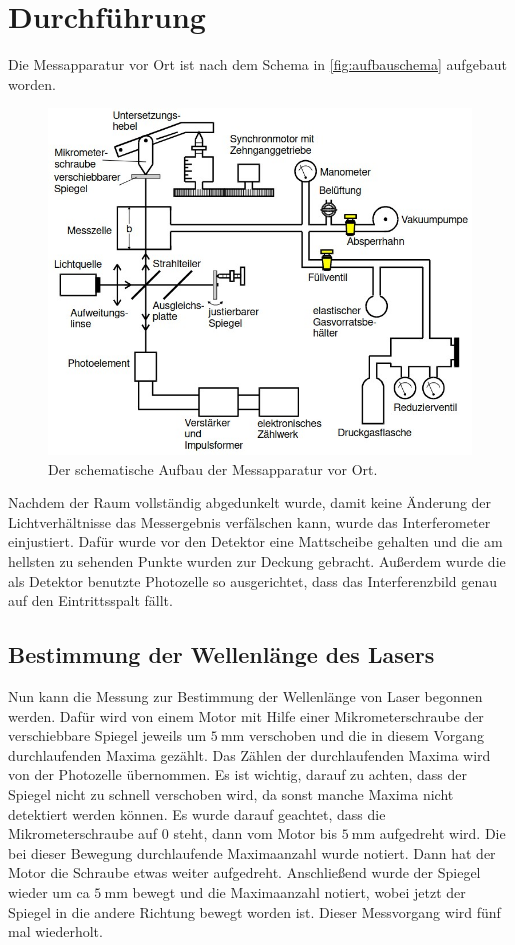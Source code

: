 \section{Durchführung}
\label{sec:Durchführung}
Die Messapparatur vor Ort ist nach dem Schema in \autoref{fig:aufbauschema} aufgebaut worden.
\begin{figure}
    \centering
    \includegraphics[width=\textwidth]{content/aufbauversuch.jpg}
    \caption{Der schematische Aufbau der Messapparatur vor Ort.}
    \label{fig:aufbauschema}
\end{figure}

\noindent
Nachdem der Raum vollständig abgedunkelt wurde, damit keine Änderung der Lichtverhältnisse das Messergebnis verfälschen kann, wurde das Interferometer einjustiert.
Dafür wurde vor den Detektor eine Mattscheibe gehalten und die am hellsten zu sehenden Punkte wurden zur Deckung gebracht. Außerdem wurde die als Detektor benutzte
Photozelle so ausgerichtet, dass das Interferenzbild genau auf den Eintrittsspalt fällt.


\subsection{Bestimmung der Wellenlänge des Lasers}
Nun kann die Messung zur Bestimmung der Wellenlänge von Laser begonnen werden. Dafür wird von einem Motor mit Hilfe einer Mikrometerschraube der verschiebbare 
Spiegel jeweils um $\SI{5}{\milli\meter}$ verschoben und die in diesem Vorgang durchlaufenden Maxima gezählt. Das Zählen der durchlaufenden Maxima wird von der 
Photozelle übernommen. Es ist wichtig, darauf zu achten, dass der Spiegel nicht zu schnell verschoben wird, da sonst manche Maxima nicht detektiert werden können.
Es wurde darauf geachtet, dass die Mikrometerschraube auf 0 steht, dann vom Motor bis $\SI{5}{\milli\metre}$ aufgedreht wird. Die bei dieser Bewegung durchlaufende
Maximaanzahl wurde notiert. Dann hat der Motor die Schraube etwas weiter aufgedreht. Anschließend wurde der Spiegel wieder um ca $\SI{5}{\milli\meter}$ bewegt und 
die Maximaanzahl notiert, wobei jetzt der Spiegel in die andere Richtung bewegt worden ist. Dieser Messvorgang wird fünf mal wiederholt.


